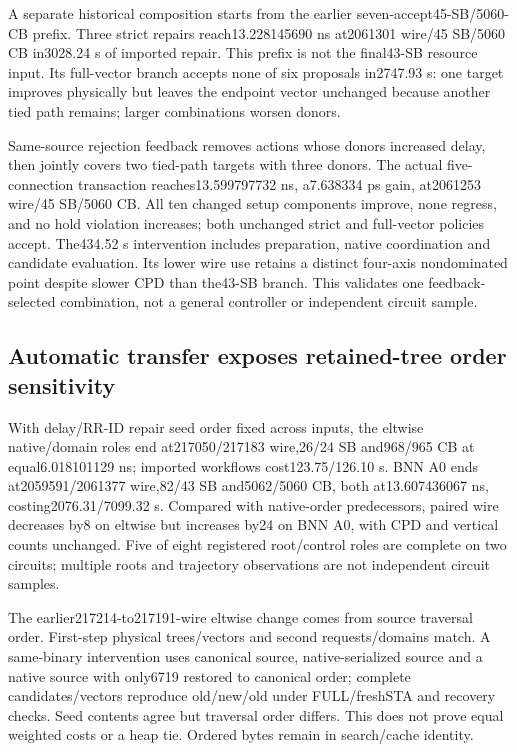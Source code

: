 \documentclass[conference,10pt]{IEEEtran}
\begin{document}
A separate historical composition starts from the earlier seven-accept45-SB/5060-CB prefix. Three strict repairs reach13.228145690 ns at2061301 wire/45 SB/5060 CB in3028.24 s of imported repair. This prefix is not the final43-SB resource input. Its full-vector branch accepts none of six proposals in2747.93 s: one target improves physically but leaves the endpoint vector unchanged because another tied path remains; larger combinations worsen donors.

Same-source rejection feedback removes actions whose donors increased delay, then jointly covers two tied-path targets with three donors. The actual five-connection transaction reaches13.599797732 ns, a7.638334 ps gain, at2061253 wire/45 SB/5060 CB. All ten changed setup components improve, none regress, and no hold violation increases; both unchanged strict and full-vector policies accept. The434.52 s intervention includes preparation, native coordination and candidate evaluation. Its lower wire use retains a distinct four-axis nondominated point despite slower CPD than the43-SB branch. This validates one feedback-selected combination, not a general controller or independent circuit sample.

\subsection{Automatic transfer exposes retained-tree order sensitivity}
With delay/RR-ID repair seed order fixed across inputs, the eltwise native/domain roles end at217050/217183 wire,26/24 SB and968/965 CB at equal6.018101129 ns; imported workflows cost123.75/126.10 s. BNN A0 ends at2059591/2061377 wire,82/43 SB and5062/5060 CB, both at13.607436067 ns, costing2076.31/7099.32 s. Compared with native-order predecessors, paired wire decreases by8 on eltwise but increases by24 on BNN A0, with CPD and vertical counts unchanged. Five of eight registered root/control roles are complete on two circuits; multiple roots and trajectory observations are not independent circuit samples.

The earlier217214-to217191-wire eltwise change comes from source traversal order. First-step physical trees/vectors and second requests/domains match. A same-binary intervention uses canonical source, native-serialized source and a native source with only6719 restored to canonical order; complete candidates/vectors reproduce old/new/old under FULL/freshSTA and recovery checks. Seed contents agree but traversal order differs. This does not prove equal weighted costs or a heap tie. Ordered bytes remain in search/cache identity.
\end{document}
